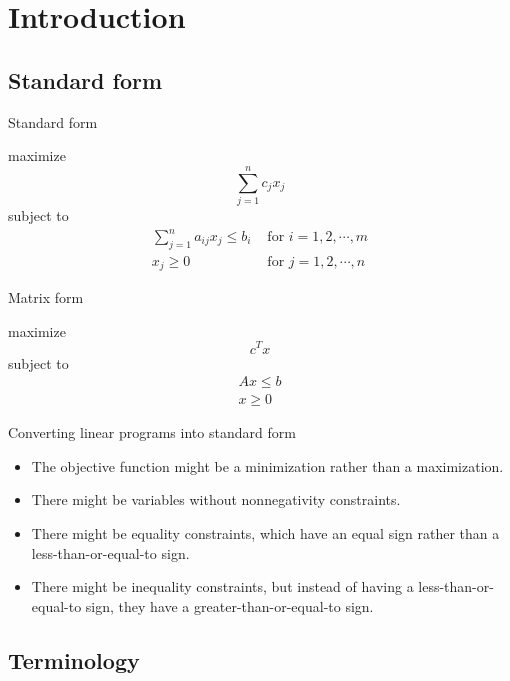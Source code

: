 \section{Introduction}

\subsection{Standard form}

\begin{frame}{Standard form}

    maximize $$\sum_{j=1}^{n}c_jx_j$$
    subject to 
        \begin{align*}
            \sum_{j=1}^{n}a_{ij}x_j\le b_i & \text{ for }i=1,2,\cdots,m\\
            x_j\ge 0 & \text{ for } j=1,2,\cdots, n
        \end{align*}

\end{frame}

\begin{frame}{Matrix form}

    maximize $$c^Tx$$
    subject to 
        \begin{align*}
            Ax\le b\\
            x\ge 0
        \end{align*}
    
\end{frame}

\begin{frame}{Converting linear programs into standard form}

    \begin{itemize}
        \item The objective function might be a minimization rather than a maximization.
        \item There might be variables without nonnegativity constraints.
        \item There might be equality constraints, which have an equal sign rather than a
        less-than-or-equal-to sign.
        \item There might be inequality constraints, but instead of having a 
        less-than-or-equal-to sign, they have a greater-than-or-equal-to sign.
    \end{itemize}
    
\end{frame}

\subsection{Terminology}

